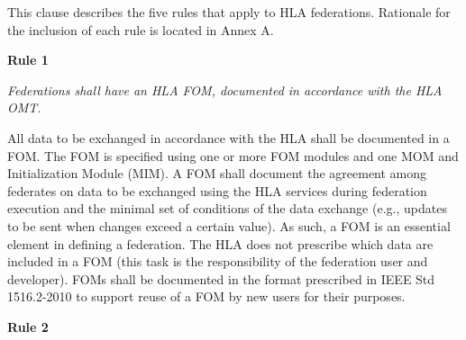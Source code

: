 
\newcommand{\federationrulesubclause}[1]{%
    \par\vspace{11.4pt}%
    {\sffamily\bfseries\fontsize{10.98pt}{13.2pt}\selectfont #1\par}%
    \vspace{6.6pt}%
}

\vspace{2.1pt}

This clause describes the five rules that apply to HLA federations. Rationale for the inclusion of each rule is\linebreak
located in Annex A.

\federationrulesubclause{5.1 Rule 1}

\textit{Federations shall have an HLA FOM, documented in accordance with the HLA OMT.}
\vspace{6pt}

All data to be exchanged in accordance with the HLA shall be documented in a FOM. The FOM is specified\linebreak
using one or more FOM modules and one MOM and Initialization Module (MIM). A FOM shall document\linebreak
the agreement among federates on data to be exchanged using the HLA services during federation execution\linebreak
and the minimal set of conditions of the data exchange (e.g., updates to be sent when changes exceed a\linebreak
certain value). As such, a FOM is an essential element in defining a federation. The HLA does not prescribe\linebreak
which data are included in a FOM (this task is the responsibility of the federation user and developer).\linebreak
FOMs shall be documented in the format prescribed in IEEE Std 1516.2-2010 to support reuse of a FOM by\linebreak
new users for their purposes.

\federationrulesubclause{5.2 Rule 2}


